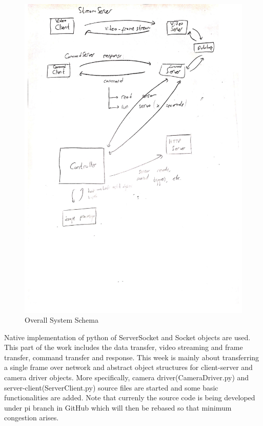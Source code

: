 \documentclass[12pt]{article}
\begin{document}
\begin{figure}
    \centering
    \includegraphics[width=0.98\linewidth]{SchemaSharpened.jpg}
    \caption{Overall System Schema}
    \label{fig:overallView}
\end{figure}

Native implementation of python of ServerSocket and Socket objects are used. This part of the work includes the data transfer, video streaming and frame transfer, command transfer and response. This week is mainly about transferring a single frame over network and abstract object structures for client-server and camera driver objects. More specifically, camera driver(CameraDriver.py) and server-client(ServerClient.py) source files are started and some basic functionalities are added. Note that currenly the source code is being developed under pi branch in GitHub which will then be rebased so that minimum congestion arises.
\end{document}
